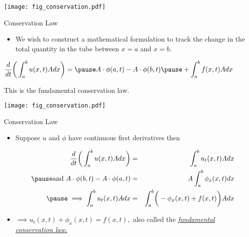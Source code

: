 \documentclass[t,10pt,fleqn]{beamer}
\def\ds{\displaystyle}
\def\({\biggr ( }
\def\){\biggr ) }
\newcommand{\tu}[1]{\underline{\textit{#1}}}
\begin{document}
 \begin{frame}{}
\begin{center}
\vspace{-2.7cm}
\texttt{[image: fig\_conservation.pdf]}
\end{center}
 \vspace{-2.7cm}
 \begin{block}{Conservation Law}
  \begin{itemize}
     \pause
     \item We wish to construct a mathematical formulation to track the change in the total quantity in the tube between $x=a$ and $x=b$.
       \pause
       
 \end{itemize}
\begin{center}
       $ \ds \frac{ d }{ dt}  \(  \int_a^b u(x,t) A dx  \) = \pause
            A \cdot \phi(a,t) - A \cdot \phi(b,t) \pause
             + \int_a^b f(x,t) A dx$
\end{center}
\pause
This is the fundamental conservation law.   
\end{block}
  
 \end{frame}
 \begin{frame}{}
\begin{center}
\vspace{-2.4cm}
\texttt{[image: fig\_conservation.pdf]}
\end{center}
 \vspace{-2.4cm}

 
 \pause 
 
  \begin{block}{Conservation Law}
  \begin{itemize}
     \pause
     \item Suppose $u$ and $\phi$ have continuous first derivatives then   \pause
       

 
 \vspace{-3ex}
\begin{eqnarray*}
      \ds  \frac{ d }{ dt}  \(  \int_a^b u(x,t) A dx  \)  & = &  \int_a^b u_t(x,t) A dx  \\ \pause
       \text{and } A \cdot \phi(b,t) - A \cdot \phi(a,t)   & = &  A \int_a^b \phi_x(x,t) dx \\ \pause
        \implies     \int_a^b u_t(x,t) A dx  & = &   \int_a^b \( -\phi_x(x,t) + f(x,t) \) A dx
\end{eqnarray*}
\pause
 \vspace{-1.5ex}
\item $\implies u_t(x,t) + \phi_x(x,t)= f(x,t),$ also called the \tu{fundamental conservation law.  }

 \end{itemize}
 
\end{block}
 
 
 \end{frame}
\end{document}
